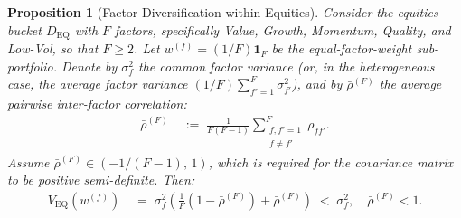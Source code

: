 \documentclass[12pt,openany]{book}
\newcommand{\bfw}{\mathbf{w}}
\newcommand{\bfone}{\mathbf{1}}
\newcommand{\calD}{\mathcal{D}}
\numberwithin{equation}{chapter}
\theoremstyle{plain}
\newtheorem{proposition}[theorem]{Proposition}
\theoremstyle{definition}
\theoremstyle{remark}
\def\calD{D}%
\def\mathcal#1{#1}%
\def\bfw{w}%
\begin{document}
\begin{proposition}[Factor Diversification within Equities]
\label{prop:factor-div}
Consider the equities bucket $\calD_{\mathrm{EQ}}$ with $F$ factors,
specifically Value, Growth, Momentum, Quality, and Low-Vol, so that
$F \geq 2$.  Let $\bfw^{(f)} = (1/F)\bfone_F$ be the
equal-factor-weight sub-portfolio.  Denote by $\sigma_f^2$ the
common factor variance (or, in the heterogeneous case, the average
factor variance $(1/F)\sum_{f'=1}^{F}\sigma_{f'}^2$), and by
$\bar{\rho}^{(F)}$ the average pairwise inter-factor correlation:
\begin{align}
  \bar{\rho}^{(F)}
  &\;:=\; \frac{1}{F(F-1)}
          \sum_{\substack{f,f'=1\\f\neq f'}}^{F}
          \rho_{ff'}.
\end{align}
Assume $\bar{\rho}^{(F)} \in (-1/(F-1),\, 1)$, which is required
for the covariance matrix to be positive semi-definite.  Then:
\begin{align}
  V_{\mathrm{EQ}}(\bfw^{(f)})
  &\;=\; \sigma_f^2\!\left(
           \frac{1}{F}(1 - \bar{\rho}^{(F)})
           + \bar{\rho}^{(F)}
         \right)
  \;<\; \sigma_f^2,
  \quad \bar{\rho}^{(F)} < 1.
  \label{eq:factor-div}
\end{align}
\end{proposition}
\end{document}
